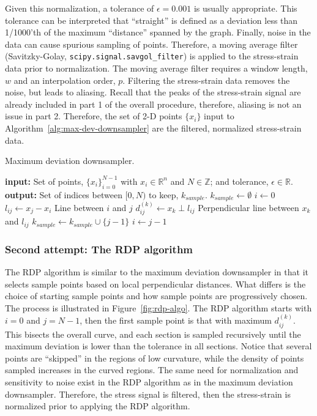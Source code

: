 \documentclass[a4paper,11pt]{article}
\begin{document}
Given this normalization, a tolerance of $\epsilon = 0.001$ is usually appropriate.
This tolerance can be interpreted that ``straight'' is defined as a deviation less than 1/1000'th of the maximum ``distance'' spanned by the graph.
Finally, noise in the data can cause spurious sampling of points.
Therefore, a moving average filter (Savitzky-Golay, \texttt{scipy.signal.savgol\_filter}) is applied to the stress-strain data prior to normalization.
The moving average filter requires a window length, $w$ and an interpolation order, $p$.
Filtering the stress-strain data removes the noise, but leads to aliasing.
Recall that the peaks of the stress-strain signal are already included in part 1 of the overall procedure, therefore, aliasing is not an issue in part 2.
Therefore, the set of 2-D points $\{x_i\}$ input to Algorithm~\ref{alg:max-dev-downsampler} are the filtered, normalized stress-strain data.

\begin{algorithm}
	\caption{Maximum deviation downsampler.}
	\label{alg:max-dev-downsampler}
	\begin{algorithmic}[1]
		\State \textbf{input:} Set of points, $\{x_i\}_{i=0}^{N-1}$ with $x_i \in \mathbb{R}^n$ and $N \in \mathbb{Z}$; and tolerance, $\epsilon \in \mathbb{R}$.
        \State \textbf{output:} Set of indices between $[0, N)$ to keep, $k_{sample}$.
        \State $k_{sample} \gets \emptyset$
        \State $i \gets 0$
			\State $l_{ij} \gets x_j - x_i$
            \Comment Line between $i$ and $j$
                \State $d^{(k)}_{ij} \gets x_k \perp l_{ij}$
                \Comment Perpendicular line between $x_k$ and $l_{ij}$
            \EndFor
                \State $k_{sample} \gets k_{sample} \cup \{j - 1 \}$
                \State $i \gets j - 1$
            \EndIf
		\EndFor
\end{algorithmic}
\end{algorithm}

\subsubsection{Second attempt: The RDP algorithm}

The RDP algorithm is similar to the maximum deviation downsampler in that it selects sample points based on local perpendicular distances.
What differs is the choice of starting sample points and how sample points are progressively chosen.
The process is illustrated in Figure~\ref{fig:rdp-algo}.
The RDP algorithm starts with $i = 0$ and $j = N-1$, then the first sample point is that with maximum $d^{(k)}_{ij}$.
This bisects the overall curve, and each section is sampled recursively until the maximum deviation is lower than the tolerance in all sections.
Notice that several points are ``skipped'' in the regions of low curvature, while the density of points sampled increases in the curved regions.
The same need for normalization and sensitivity to noise exist in the RDP algorithm as in the maximum deviation downsampler.
Therefore, the stress signal is filtered, then the stress-strain is normalized prior to applying the RDP algorithm.
\end{document}
